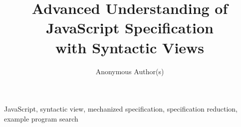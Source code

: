\documentclass[10pt,conference]{IEEEtran}
\begin{document}
\title{Advanced Understanding of JavaScript Specification\\
with Syntactic Views}

\author{Anonymous Author(s)}

%
%
%
%
%
%

\maketitle



\begin{IEEEkeywords}
JavaScript,
syntactic view,
mechanized specification,
specification reduction,
example program search
\end{IEEEkeywords}











\balance


% 
\end{document}
